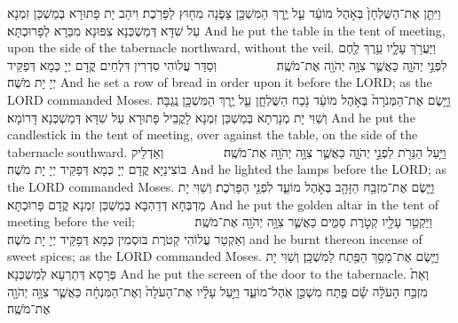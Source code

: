 {%
{וַיִּתֵּ֤ן אֶת־הַשֻּׁלְחָן֙ בְּאֹ֣הֶל מוֹעֵ֔ד עַ֛ל יֶ֥רֶךְ הַמִּשְׁכָּ֖ן צָפֹ֑נָה מִח֖וּץ לַפָּרֹֽכֶת׃
}
{וִיהַב יָת פָּתוּרָא בְּמַשְׁכַּן זִמְנָא עַל שִׁדָּא דְּמַשְׁכְּנָא צִפּוּנָא מִבַּרָא לְפָרוּכְתָּא׃}
{And he put the table in the tent of meeting, upon the side of the tabernacle northward, without the veil.}{}
{וַיַּעֲרֹ֥ךְ עָלָ֛יו עֵ֥רֶךְ לֶ֖חֶם לִפְנֵ֣י יְהֹוָ֑ה כַּאֲשֶׁ֛ר צִוָּ֥ה יְהֹוָ֖ה אֶת־מֹשֶֽׁה׃ \setuma         }
{וְסַדַּר עֲלוֹהִי סִדְרִין דִּלְחֵים קֳדָם יְיָ כְּמָא דְּפַקֵּיד יְיָ יָת מֹשֶׁה׃}
{And he set a row of bread in order upon it before the LORD; as the LORD commanded Moses.}{}
{וַיָּ֤שֶׂם אֶת־הַמְּנֹרָה֙ בְּאֹ֣הֶל מוֹעֵ֔ד נֹ֖כַח הַשֻּׁלְחָ֑ן עַ֛ל יֶ֥רֶךְ הַמִּשְׁכָּ֖ן נֶֽגְבָּה׃}
{וְשַׁוִּי יָת מְנָרְתָא בְּמַשְׁכַּן זִמְנָא לָקֳבֵיל פָּתוּרָא עַל שִׁדָּא דְּמַשְׁכְּנָא דָּרוֹמָא׃}
{And he put the candlestick in the tent of meeting, over against the table, on the side of the tabernacle southward.}{}
{וַיַּ֥עַל הַנֵּרֹ֖ת לִפְנֵ֣י יְהֹוָ֑ה כַּאֲשֶׁ֛ר צִוָּ֥ה יְהֹוָ֖ה אֶת־מֹשֶֽׁה׃ \setuma         }
{וְאַדְלֵיק בּוֹצִינַיָּא קֳדָם יְיָ כְּמָא דְּפַקֵּיד יְיָ יָת מֹשֶׁה׃}
{And he lighted the lamps before the LORD; as the LORD commanded Moses.}{}
{וַיָּ֛שֶׂם אֶת־מִזְבַּ֥ח הַזָּהָ֖ב בְּאֹ֣הֶל מוֹעֵ֑ד לִפְנֵ֖י הַפָּרֹֽכֶת׃}
{וְשַׁוִּי יָת מַדְבְּחָא דְּדַהְבָּא בְּמַשְׁכַּן זִמְנָא קֳדָם פָּרוּכְתָּא׃}
{And he put the golden altar in the tent of meeting before the veil;}{}
{וַיַּקְטֵ֥ר עָלָ֖יו קְטֹ֣רֶת סַמִּ֑ים כַּאֲשֶׁ֛ר צִוָּ֥ה יְהֹוָ֖ה אֶת־מֹשֶֽׁה׃ \setuma         
}
{וְאַקְטַר עֲלוֹהִי קְטֹרֶת בּוּסְמִין כְּמָא דְּפַקֵּיד יְיָ יָת מֹשֶׁה׃}
{and he burnt thereon incense of sweet spices; as the LORD commanded Moses.}{}
{וַיָּ֛שֶׂם אֶת־מָסַ֥ךְ הַפֶּ֖תַח לַמִּשְׁכָּֽן׃}
{וְשַׁוִּי יָת פְּרָסָא דְּתַרְעָא לְמַשְׁכְּנָא׃}
{And he put the screen of the door to the tabernacle.}{}
{וְאֵת֙ מִזְבַּ֣ח הָעֹלָ֔ה שָׂ֕ם פֶּ֖תַח מִשְׁכַּ֣ן אֹֽהֶל־מוֹעֵ֑ד וַיַּ֣עַל עָלָ֗יו אֶת־הָעֹלָה֙ וְאֶת־הַמִּנְחָ֔ה כַּאֲשֶׁ֛ר צִוָּ֥ה יְהֹוָ֖ה אֶת־מֹשֶֽׁה׃ \setuma         
}}
